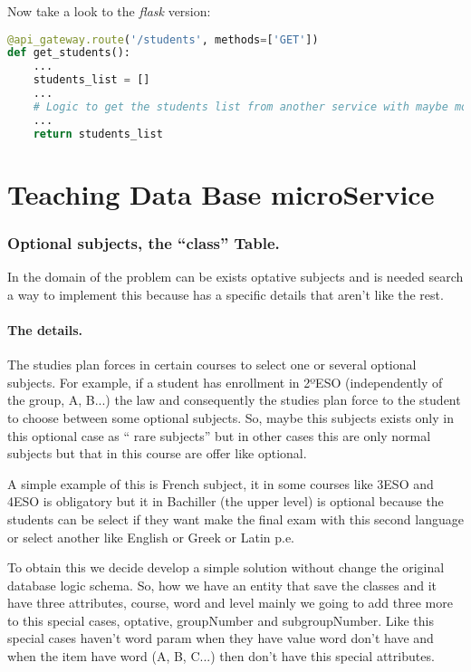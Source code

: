 Now take a look to the \emph{flask} version:

\begin{lstlisting}[language=python,frame=none]
@api_gateway.route('/students', methods=['GET'])
def get_students():
    ...
    students_list = []
    ...
    # Logic to get the students list from another service with maybe more logic.
    ...
    return students_list
\end{lstlisting}


\section{Teaching Data Base microService}

\subsubsection{Optional subjects, the ``class'' Table.}

In the domain of the problem can be exists optative subjects and is
needed search a way to implement this because has a specific details
that aren't like the rest.

\paragraph{The details.}

The studies plan forces in certain courses to select one or several
optional subjects. For example, if a student has enrollment in 2ºESO
(independently of the group, A, B...) the law and consequently the
studies plan force to the student to choose between some optional
subjects. So, maybe this subjects exists only in this optional case
as `` rare subjects'' but in other cases this are only normal subjects
but that in this course are offer like optional.

A simple example of this is French subject, it in some courses like
3ESO and 4ESO is obligatory but it in Bachiller (the upper level)
is optional because the students can be select if they want make the
final exam with this second language or select another like English
or Greek or Latin p.e.

To obtain this we decide develop a simple solution without change
the original database logic schema. So, how we have an entity that
save the classes and it have three attributes, course, word and level
mainly we going to add three more to this special cases, optative,
groupNumber and subgroupNumber. Like this special cases haven't word
param when they have value word don't have and when the item have
word (A, B, C...) then don't have this special attributes.

